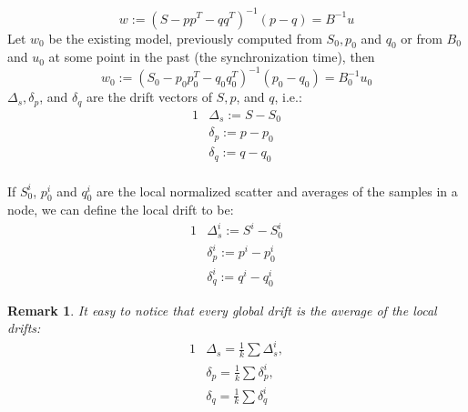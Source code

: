 \documentclass[11pt,twocolumn,varwidth=true,a4paper,fleqn]{article}
\newtheorem{remark}{Remark}
\begin{document}
\begin{equation*}
w:=(S - pp^T - qq^T)^{-1}(p-q)=B^{-1}u
\end{equation*}
Let $w_0$ be the existing model, previously computed from $S_0, p_0$ and $q_0$
or from $B_0$ and $u_0$ at some point in the past (the synchronization time),
then
\begin{equation*} 
w_0:=(S_0 - p_0p_0^T - q_0q_0^T)^{-1}(p_0-q_0)=B_0^{-1}u_0
\end{equation*}
$\Delta_s, \delta_p$, and $\delta_q$ are the drift vectors of $S, p$, and $q$, i.e.:
\begin{alignat*}{1}
& \Delta_s:= S - S_0 \\
& \delta_p:= p - p_0 \\
& \delta_q := q - q_0
\end{alignat*}
\\If $S_0^i$, $p_0^i$ and $q_0^i$ are the local normalized scatter and averages
of the samples in a node, we can define the local drift to be:
\begin{alignat*}{1}
& \Delta_s^i:= S^i - S_0^i
\\ & \delta_p^i:= p^i - p_0^i
\\ & \delta_q^i:= q^i - q_0^i
\end{alignat*}
\begin{remark} \label{average}
It easy to notice that every global drift is the average of the local drifts:
\begin{alignat*}{1}
& \Delta_s = \frac{1}{k} \sum \Delta_s^i, \\
& \delta_p = \frac{1}{k} \sum \delta_p^i, \\
& \delta_q = \frac{1}{k} \sum \delta_q^i 
\end{alignat*}

\end{remark}
\end{document}

